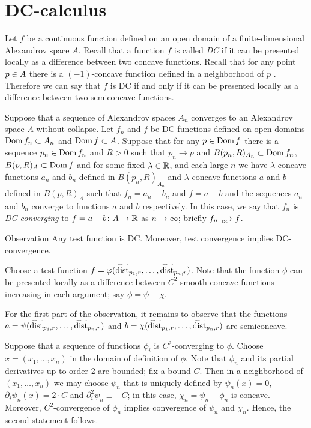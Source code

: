  
 
 
 

  
 
\section{DC-calculus}\label{sec:DC}

Let $f$ be a continuous function defined on an open domain of a finite-dimensional Alexandrov space $A$.
Recall that a function $f$ is called \emph{DC} if it can be presented locally as a difference between two concave functions.
Recall that for any point $p\zz\in A$ there is a $(-1)$-concave function defined in a  neighborhood  of $p$ \cite[3.6]{PerMorse}.
Therefore we can say that $f$ is DC if and only if it can be presented locally as a difference between two semiconcave functions. 

Suppose that a sequence of Alexandrov spaces $A_n$ converges to an Alexandrov space $A$ without collapse.
Let $f_n$ and $f$ be DC functions defined on open domains $\Dom f_n\zz\subset A_n$ and $\Dom f \zz\subset A$.
Suppose that for any $p\in \mathop{\rm Dom} f$ there is a sequence $p_n\in \mathop{\rm Dom} f_n$ and $R>0$ such that $p_n\to p$ and $B(p_n,R)_{A_n}\subset \mathop{\rm Dom} f_n$, $B(p,R)_{A}\subset\mathop{\rm Dom} f$
and for some fixed $\lambda\in\mathbb{R}$, and each large $n$ we have $\lambda$-concave functions $a_n$ and $b_n$ defined in $B(p_n,R)_{A_n}$ and $\lambda$-concave functions $a$ and $b$ defined in $B(p,R)_{A}$
such that $f_n=a_n-b_n$ and $f=a-b$ and the sequences
$a_n$ and $b_n$ converge to functions $a$ and $b$ respectively.
In this case, we say that $f_n$ is \emph{DC-converging} to $f=a-b\colon A\to \mathbb{R}$ as $n\to\infty$; briefly $f_n\DCto f$.

\begin{thm}{Observation}\label{obs:test-DC}
Any test function is DC.
Moreover, test convergence implies DC-convergence. 
\end{thm}

Choose a test-function $f=\varphi(\widetilde{\operatorname{\rm dist}}_{p_1,r},\dots,\widetilde{\operatorname{\rm dist}}_{p_n,r})$.
Note that the function $\phi$ can be presented locally as a difference between $C^2$-smooth concave functions increasing in each argument; say $\phi=\psi-\chi$.

For the first part of the observation, it remains to observe that the functions $a=\psi(\widetilde{\operatorname{\rm dist}}_{p_1,r},\dots,\widetilde{\operatorname{\rm dist}}_{p_n,r})$ and $b=\chi(\widetilde{\operatorname{\rm dist}}_{p_1,r},\dots,\widetilde{\operatorname{\rm dist}}_{p_n,r})$ are semiconcave.

Suppose that a sequence of functions $\phi_i$ is $C^2$-converging to $\phi$.
Choose $x=(x_1,\dots,x_n)$ in the domain of definition of $\phi$.
Note that $\phi_n$ and its partial derivatives up to order 2 are bounded;
fix a bound $C$.
Then in a neighborhood of $(x_1,\dots,x_n)$ we may choose $\psi_n$ that is uniquely defined by $\psi_n(x)=0$, $\partial_i\psi_n(x)=2\cdot C$ and $\partial_i^2\psi_n\equiv -C$; in this case, $\chi_n=\psi_n-\phi_n$ is concave.
Moreover, $C^2$-convergence of $\phi_n$ implies convergence of $\psi_n$ and $\chi_n$.
Hence, the second statement follows.
\qeds


